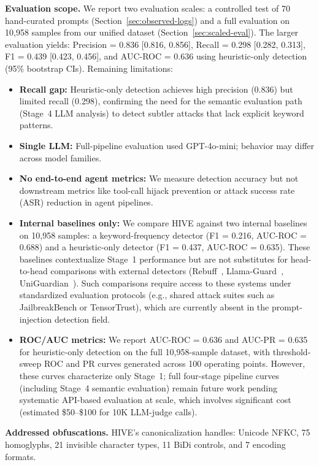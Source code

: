 \documentclass[manuscript,screen,review]{acmart}
\begin{document}
\textbf{Evaluation scope.} We report two evaluation scales: a controlled test of 70 hand-curated prompts (Section~\ref{sec:observed-logs}) and a full evaluation on 10{,}958 samples from our unified dataset (Section~\ref{sec:scaled-eval}). The larger evaluation yields: Precision = 0.836 [0.816, 0.856], Recall = 0.298 [0.282, 0.313], F1 = 0.439 [0.423, 0.456], and AUC-ROC = 0.636 using heuristic-only detection (95\% bootstrap CIs). Remaining limitations:
\begin{itemize}
\item \textbf{Recall gap:} Heuristic-only detection achieves high precision (0.836) but limited recall (0.298), confirming the need for the semantic evaluation path (Stage~4 LLM analysis) to detect subtler attacks that lack explicit keyword patterns.
\item \textbf{Single LLM:} Full-pipeline evaluation used GPT-4o-mini; behavior may differ across model families.
\item \textbf{No end-to-end agent metrics:} We measure detection accuracy but not downstream metrics like tool-call hijack prevention or attack success rate (ASR) reduction in agent pipelines.
\item \textbf{Internal baselines only:} We compare HIVE against two internal baselines on 10{,}958 samples: a keyword-frequency detector (F1 = 0.216, AUC-ROC = 0.688) and a heuristic-only detector (F1 = 0.437, AUC-ROC = 0.635). These baselines contextualize Stage~1 performance but are not substitutes for head-to-head comparisons with external detectors (Rebuff~\cite{b13}, Llama-Guard~\cite{llamaguard2023}, UniGuardian~\cite{uniguardian2024}). Such comparisons require access to these systems under standardized evaluation protocols (e.g., shared attack suites such as JailbreakBench or TensorTrust), which are currently absent in the prompt-injection detection field.
\item \textbf{ROC/AUC metrics:} We report AUC-ROC = 0.636 and AUC-PR = 0.635 for heuristic-only detection on the full 10{,}958-sample dataset, with threshold-sweep ROC and PR curves generated across 100 operating points. However, these curves characterize only Stage~1; full four-stage pipeline curves (including Stage~4 semantic evaluation) remain future work pending systematic API-based evaluation at scale, which involves significant cost (estimated \$50--\$100 for 10K LLM-judge calls).

\end{itemize}

\textbf{Addressed obfuscations.} HIVE's canonicalization handles: Unicode NFKC, 75 homoglyphs, 21 invisible character types, 11 BiDi controls, and 7 encoding formats.
\end{document}

